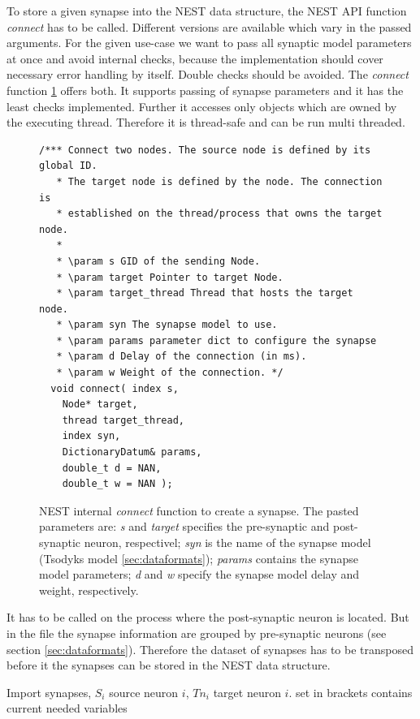 To store a given synapse into the NEST data structure,
the NEST API function \emph{connect} has to be called.  
Different versions are available which vary in the passed arguments.
For the given use-case we want to pass all synaptic model parameters at once and
avoid internal checks, because the implementation should cover necessary error handling by 
itself. Double checks should be avoided.
The \emph{connect} function \ref{code:connect} offers both.
It supports passing of synapse parameters and it has the least checks implemented.
Further it accesses only objects which are owned by the executing thread. 
Therefore it is thread-safe and can be run multi threaded.
\begin{figure}[ht!]
\begin{lstlisting}[style=cppcode]
/*** Connect two nodes. The source node is defined by its global ID.
   * The target node is defined by the node. The connection is
   * established on the thread/process that owns the target node.
   *
   * \param s GID of the sending Node.
   * \param target Pointer to target Node.
   * \param target_thread Thread that hosts the target node.
   * \param syn The synapse model to use.
   * \param params parameter dict to configure the synapse
   * \param d Delay of the connection (in ms).
   * \param w Weight of the connection. */
  void connect( index s,
    Node* target,
    thread target_thread,
    index syn,
    DictionaryDatum& params,
    double_t d = NAN,
    double_t w = NAN );
\end{lstlisting}
\caption{NEST internal \emph{connect} function to create a synapse. The pasted parameters are:
\emph{s} and \emph{target} specifies the pre-synaptic and post-synaptic neuron, respectivel;
\emph{syn} is the name of the synapse model (Tsodyks model \ref{sec:dataformats});
\emph{params} contains the synapse model parameters;
\emph{d} and \emph{w} specify the synapse model delay and weight, respectively.}
\label{code:connect}
\end{figure}
It has to be called on the process where the post-synaptic neuron is located.
But in the file the synapse information are grouped by pre-synaptic neurons (see section \ref{sec:dataformats}).
Therefore the dataset of synapses has to be transposed before it the synapses can be stored in the NEST data structure.
\begin{algorithm}[ht!]
	\caption{Import synapses, $S_i$ source neuron $i$, $Tn_i$ target neuron $i$.
	set in brackets contains current needed variables}
\label{alg2}
\end{algorithm}
